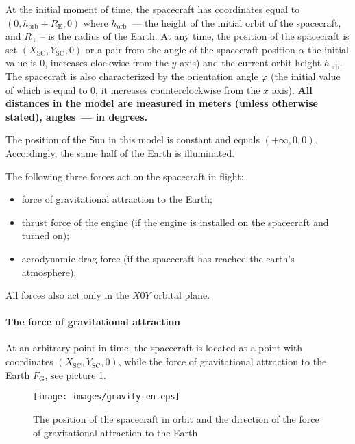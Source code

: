 \documentclass[12pt,a4paper]{article}
\begin{document}
At the initial moment of time, the spacecraft has coordinates equal to $(0, h_{\text{orb}} + R_{\text{E}},
0)$ where $h_{\text{orb}}$~--– the height of the initial orbit of the spacecraft, and $R_{\text{З}}$~-- is the radius of the Earth. At any time, the position of the spacecraft is set
$(X_{\text{SC}}, Y_{\text{SC}}, 0)$ or a pair from the angle of the spacecraft position $\alpha$ the initial value is 0, increases clockwise from the $y$ axis) and the current orbit height $h_{\text{orb}}$. The spacecraft is also characterized by the orientation angle $\varphi$ (the initial value of which is equal to 0, it increases counterclockwise from the $x$ axis). \textbf{All distances in the model are measured in meters (unless otherwise stated), angles~--- in degrees.}

The position of the Sun in this model is constant and equals $(+\infty, 0, 0)$. Accordingly, the same half of the Earth is illuminated.

The following three forces act on the spacecraft in flight:

\begin{itemize}
\item force of gravitational attraction to the Earth;
\item thrust force of the engine (if the engine is installed on the spacecraft and turned on);
\item aerodynamic drag force (if the spacecraft has reached the earth's atmosphere).
\end{itemize}

All forces also act only in the $X0Y$ orbital plane.

\paragraph{The force of gravitational attraction}

At an arbitrary point in time, the spacecraft is located at a point with coordinates $(X_{\text{SC}}, Y_{\text{SC}}, 0)$, while the force of gravitational attraction to the Earth $F_{\text {G}}$, see picture \ref{Pic:Gravity}.

\begin{figure}[tbh]
  \begin{center}
    \texttt{[image: images/gravity-en.eps]}
    \caption{The position of the spacecraft in orbit and the direction of the force of gravitational attraction to the Earth}
    \label{Pic:Gravity}
  \end{center}
\end{figure}
\end{document}
